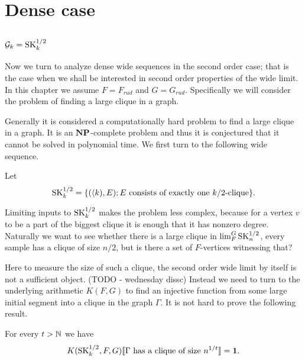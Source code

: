 \chapter{Dense case}\label{chapdense}

\section{$\mathcal{G}_k=\text{SK}_k^{1/2}$}

Now we turn to analyze dense wide sequences in the second order case; that is the case when we shall be interested in second order properties of the wide limit. In this chapter we assume $F=F_{rud}$ and $G=G_{rud}$. Specifically we will consider the problem of finding a large clique in a graph. 

Generally it is considered a computationally hard problem to find a large clique in a graph. It is an $\textbf{NP}$-complete problem and thus it is conjectured that it cannot be solved in polynomial time. We first turn to the following wide sequence.

\begin{defi}
Let \[\text{SK}_k^{1/2}=\{(\langle k),E);\text{$E$ consists of exactly one $k/2$-clique}\}.\]
\end{defi}

Limiting inputs to $\text{SK}_k^{1/2}$ makes the problem less complex, because for a vertex $v$ to be a part of the biggest clique it is enough that it has nonzero degree. Naturally we want to see whether there is a large clique in $\lim_F^G \text{SK}_n^{1/2}$, every sample has a clique of size $n/2$, but is there a set of $F$-vertices witnessing that? 

Here to measure the size of such a clique, the second order wide limit  by itself is not a sufficient object. (TODO - wednesday dissc) Instead we need to turn to the underlying arithmetic $K(F,G)$ to find an injective function from some large initial segment into a clique in the graph $\Gamma$. It is not hard to prove the following result.

\begin{thrm}\label{thrmsk1}For every $t>\mathbb{N}$ we have
\[K(\text{SK}_k^{1/2},F,G)\llbracket\text{$\Gamma$ has a clique of size $n^{1/t}$}\rrbracket=\textbf{1}.\]

\end{thrm}

